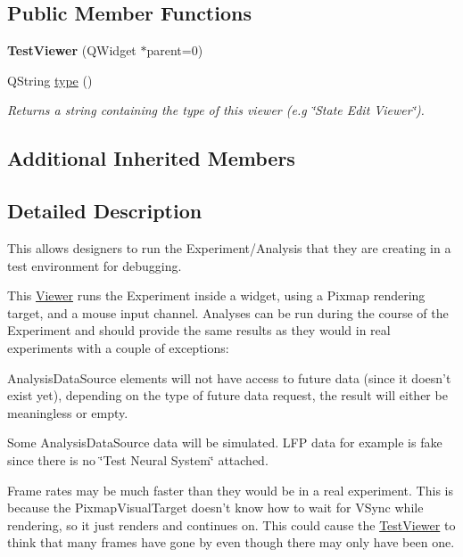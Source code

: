 \subsection*{Public Member Functions}
\begin{DoxyCompactItemize}
\item 
\hypertarget{class_test_viewer_af9c4eff886be72f03fe5d987d3dce9e9}{{\bfseries Test\-Viewer} (Q\-Widget $\ast$parent=0)}\label{class_test_viewer_af9c4eff886be72f03fe5d987d3dce9e9}

\item 
\hypertarget{class_test_viewer_a7fa1946128acf8b691b6932bdf889524}{Q\-String \hyperlink{class_test_viewer_a7fa1946128acf8b691b6932bdf889524}{type} ()}\label{class_test_viewer_a7fa1946128acf8b691b6932bdf889524}

\begin{DoxyCompactList}\small\item\em Returns a string containing the type of this viewer (e.\-g \char`\"{}\-State Edit Viewer\char`\"{}). \end{DoxyCompactList}\end{DoxyCompactItemize}
\subsection*{Additional Inherited Members}


\subsection{Detailed Description}
This allows designers to run the Experiment/\-Analysis that they are creating in a test environment for debugging. 

This \hyperlink{class_viewer}{Viewer} runs the Experiment inside a widget, using a Pixmap rendering target, and a mouse input channel. Analyses can be run during the course of the Experiment and should provide the same results as they would in real experiments with a couple of exceptions\-:
\begin{DoxyItemize}
\item Analysis\-Data\-Source elements will not have access to future data (since it doesn't exist yet), depending on the type of future data request, the result will either be meaningless or empty.
\item Some Analysis\-Data\-Source data will be simulated. L\-F\-P data for example is fake since there is no \char`\"{}\-Test Neural System\char`\"{} attached.
\item Frame rates may be much faster than they would be in a real experiment. This is because the Pixmap\-Visual\-Target doesn't know how to wait for V\-Sync while rendering, so it just renders and continues on. This could cause the \hyperlink{class_test_viewer}{Test\-Viewer} to think that many frames have gone by even though there may only have been one.
\end{DoxyItemize}

